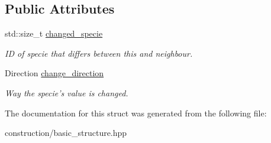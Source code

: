 \subsection*{\-Public \-Attributes}
\begin{DoxyCompactItemize}
\item 
\hypertarget{structBasTransition_abc640fc68f846a5f4c328cf801b3b451}{std\-::size\-\_\-t \hyperlink{structBasTransition_abc640fc68f846a5f4c328cf801b3b451}{changed\-\_\-specie}}\label{structBasTransition_abc640fc68f846a5f4c328cf801b3b451}

\begin{DoxyCompactList}\small\item\em \-I\-D of specie that differs between this and neighbour. \end{DoxyCompactList}\item 
\hypertarget{structBasTransition_a88ce704d3a9549dbe5c179084b66f541}{\-Direction \hyperlink{structBasTransition_a88ce704d3a9549dbe5c179084b66f541}{change\-\_\-direction}}\label{structBasTransition_a88ce704d3a9549dbe5c179084b66f541}

\begin{DoxyCompactList}\small\item\em \-Way the specie's value is changed. \end{DoxyCompactList}\end{DoxyCompactItemize}


\-The documentation for this struct was generated from the following file\-:\begin{DoxyCompactItemize}
\item 
construction/basic\-\_\-structure.\-hpp\end{DoxyCompactItemize}
